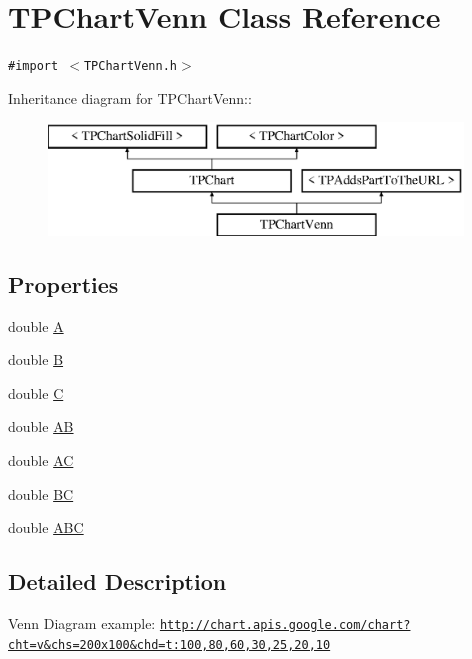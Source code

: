 \hypertarget{interface_t_p_chart_venn}{
\section{TPChartVenn Class Reference}
\label{interface_t_p_chart_venn}
}
{\tt \#import $<$TPChartVenn.h$>$}

Inheritance diagram for TPChartVenn::\begin{figure}[H]
\begin{center}
\leavevmode
\includegraphics[height=3cm]{interface_t_p_chart_venn}
\end{center}
\end{figure}
\subsection*{Properties}
\begin{CompactItemize}
\item 
double \hyperlink{interface_t_p_chart_venn_43e8846329cf05b89731f46766c11758}{A}
\item 
double \hyperlink{interface_t_p_chart_venn_825f1948fd43e6c8ab550cd6eff0afd2}{B}
\item 
double \hyperlink{interface_t_p_chart_venn_9541f2b91262bf851ca77cb32ce77e02}{C}
\item 
double \hyperlink{interface_t_p_chart_venn_d758c3b5acdbc0477ba534b4554618bf}{AB}
\item 
double \hyperlink{interface_t_p_chart_venn_59f24aff563decd762614e1b78e835e5}{AC}
\item 
double \hyperlink{interface_t_p_chart_venn_85f8bef77745132af4fadb2d8539d231}{BC}
\item 
double \hyperlink{interface_t_p_chart_venn_9f204394ed012f33f04aadbec59de00b}{ABC}
\end{CompactItemize}


\subsection{Detailed Description}
Venn Diagram example: \href{http://chart.apis.google.com/chart?cht=v&chs=200x100&chd=t:100,80,60,30,25,20,10}{\tt http://chart.apis.google.com/chart?cht=v\&chs=200x100\&chd=t:100,80,60,30,25,20,10} 

